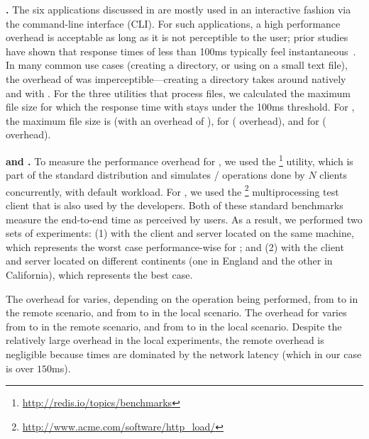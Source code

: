 
\textbf{\coreutils.} The six \coreutils applications discussed in 
 are mostly used in an interactive fashion via the
command-line interface (CLI). For such applications, a high performance
overhead is acceptable as long as it is not perceptible to the user;
prior studies have shown that response times of less than 100ms
typically feel instantaneous~\cite{card:human_proc}. In many common use
cases (\eg creating a directory, or using \cut on a small text file),
the overhead of \mx was imperceptible---\eg creating a directory takes
around \avgMkdirNative natively and \avgMkdirMx with \mx. For the three
utilities that process files, we calculated the maximum file size for
which the response time with \mx stays under the 100ms threshold.  For
\cut, the maximum file size is \cutCutoffSize (with an overhead of
\cutCutoffOver), for \mdsum \mdsumCutoffSize (\mdsumCutoffOver
overhead), and for \shasum \shasumCutoffSize (\shasumCutoffOver
overhead).



\textbf{\redis and \lighttpd.} To measure the performance overhead for \redis, 
we used
the \redisbenchmark\footnote{\url{http://redis.io/topics/benchmarks}}
utility, which is part of the standard \redis distribution and
simulates / operations done by $N$ clients
concurrently, with default workload.  For \lighttpd, we used the
\httpload\footnote{\url{http://www.acme.com/software/http_load/}}
multiprocessing test client that is also used by the \lighttpd
developers.  Both of these standard benchmarks measure the end-to-end
time as perceived by users.  As a result, we performed two sets of
experiments: (1) with the client and server located on the same
machine, which represents the worst case performance-wise for \mx; and
(2) with the client and server located on different continents (one in
England and the other in California), which represents the best case.

The overhead for \redis varies, depending on the operation being
performed, from \minRedisRemote to \maxRedisRemote in the remote
scenario, and from \minRedisOver to \maxRedisOver in the local
scenario.  The overhead for \lighttpd varies from \minLighttpdRemote
to \maxLighttpdRemote in the remote scenario, and
from \minLighttpdOver to \maxLighttpdOver in the local scenario.
Despite the relatively large overhead in the local experiments, the
remote overhead is negligible because times are dominated by the
network latency (which in our case is over $150$ms).

